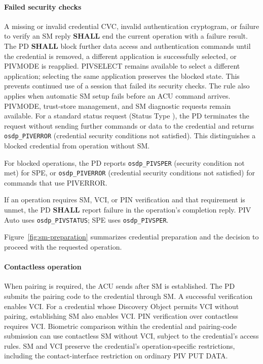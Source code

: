\paragraph{Failed security checks}
A missing or invalid credential CVC, invalid authentication cryptogram, or
failure to verify an SM reply \textbf{SHALL} end the current operation with a
failure result. The PD
\textbf{SHALL} block further data access and authentication commands until the
credential is removed, a different application is successfully selected, or
PIVMODE is reapplied. PIVSELECT remains available to select a different
application; selecting the same application preserves the blocked state.
This prevents continued use of a session that failed its security checks.
The rule also applies when automatic SM setup fails before an ACU command
arrives. PIVMODE, trust-store management, and SM diagnostic requests remain available.
For a standard status request (Status Type ), the PD terminates the
request without sending further commands or data to the credential and returns
\texttt{osdp\_PIVERROR}  (credential security conditions not
satisfied). This distinguishes a blocked credential from operation without SM.

For blocked operations, the PD reports \texttt{osdp\_PIVSPER} 
(security condition not met) for SPE, or \texttt{osdp\_PIVERROR} 
(credential security conditions not satisfied) for commands that use PIVERROR.

If an operation requires SM, VCI, or PIN verification and that requirement is
unmet, the PD \textbf{SHALL} report failure in the operation's completion reply.
PIV Auto uses \texttt{osdp\_PIVSTATUS}; SPE uses \texttt{osdp\_PIVSPER}.

Figure~\ref{fig:sm-preparation} summarizes credential preparation and the
decision to proceed with the requested operation.


\paragraph{Contactless operation}
When pairing is required, the ACU sends 
after SM is established. The PD submits the pairing
code to the credential through SM. A successful verification enables VCI. For a credential
whose Discovery Object permits VCI without pairing, establishing SM also
enables VCI.
PIN verification over contactless requires VCI. Biometric comparison within the credential
and pairing-code submission can use
contactless SM without VCI, subject to the credential's access rules.
SM and VCI preserve the credential's operation-specific restrictions, including the
contact-interface restriction on ordinary PIV PUT DATA.

